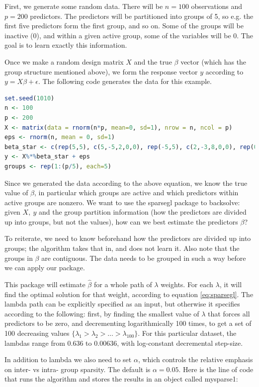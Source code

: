 \documentclass[12pt]{article}
\begin{document}
First, we generate some random data. There will be $n=100$ observations and $p=200$ predictors. The predictors will be partitioned into groups of 5, so e.g. the first five predictors form the first group, and so on. Some of the groups will be inactive ($0$), and within a given active group, some of the variables will be $0$. The goal is to learn exactly this information.

Once we make a random design matrix $X$ and the true $\beta$ vector (which has the group structure mentioned above), we form the response vector $y$ according to $y=X\beta + \epsilon$. The following code generates the data for this example.

\begin{lstlisting}[language=R]
set.seed(1010)
n <- 100
p <- 200
X <- matrix(data = rnorm(n*p, mean=0, sd=1), nrow = n, ncol = p)
eps <- rnorm(n, mean = 0, sd=1)
beta_star <- c(rep(5,5), c(5,-5,2,0,0), rep(-5,5), c(2,-3,8,0,0), rep(0,(p-20)))
y <- X%*%beta_star + eps
groups <- rep(1:(p/5), each=5)
\end{lstlisting}

Since we generated the data according to the above equation, we know the true value of $\beta$, in particular which groups are active and which predictors within active groups are nonzero. We want to use the sparsegl package to backsolve: given $X,\ y$ and the group partition information (how the predictors are divided up into groups, but not the values), how can we best estimate the predictors $\beta$?

To reiterate, we need to know beforehand how the predictors are divided up into groups; the algorithm takes that in, and does not learn it. Also note that the groups in $\beta$ are contiguous. The data needs to be grouped in such a way before we can apply our package.

This package will estimate $\hat{\beta}$ for a whole path of $\lambda$ weights. For each $\lambda$, it will find the optimal solution for that weight, according to equation \autoref{eq:sparsegl}. The lambda path can be explicitly specified as an input, but otherwise it specifies according to the following: first, by finding the smallest value of $\lambda$ that forces all predictors to be zero, and decrementing logarithmically 100 times, to get a set of 100 decreasing values $\{\lambda_1 > \lambda_2>\dots >\lambda_{100}\}$. For this particular dataset, the lambdas range from $0.636$ to $0.00636$, with log-constant decremental step-size.

In addition to lambda we also need to set $\alpha$, which controls the relative emphasis on inter- vs intra- group sparsity. The default is $\alpha = 0.05$. Here is the line of code that runs the algorithm and stores the results in an object called mysparse1:
\end{document}
